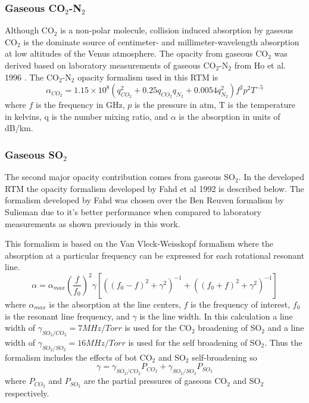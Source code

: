 \subsubsection{Gaseous CO$_2$-N$_2$}
Although CO$_2$ is a non-polar molecule, collision induced absorption by gaseous CO$_2$ \cite{Barrett-1960} is the dominate source of centimeter- and millimeter-wavelength absorption at low altitudes of the Venus atmosphere. The opacity from gaseous CO$_2$ was derived based on laboratory measurements of gaseous CO$_2$-N$_2$ from Ho et al. 1996 \cite{Ho-1966}. The CO$_2$-N$_2$ opacity formalism used in this RTM is
\begin{equation}\label{eq:rtm-co2n2}
\alpha_{CO_2} = 1.15\times 10^8(q_{CO_2}^2 + 0.25q_{CO_2}q_{N_2} + 0.0054q_{N_2}^2)f^2p^2T^{-5}
\end{equation}
where $f$ is the frequency in GHz, $p$ is the pressure in atm, T is the temperature in kelvins, q is the number mixing ratio, and $\alpha$ is the absorption in units of dB/km.

\subsubsection{Gaseous SO$_2$}
The second major opacity contribution comes from gaseous SO$_2$. In the developed RTM the opacity formalism developed by Fahd et al 1992 \cite{Fahd-thesis} is described below. The formalism developed by Fahd was chosen over the Ben Reuven formalism by Sulieman due to it's better performance when compared to laboratory measurements as shown previously in this work.

This formalism is based on the Van Vleck-Weisskopf formalism where the absorption at a particular frequency can be expressed for each rotational resonant line. 
\begin{equation}
\label{eq:rtm-so2fahd}
\alpha = \alpha_{max} \left(\frac{f}{f_0}\right)^2 \gamma [((f_0-f)^2+\gamma^2)^{-1}+((f_0+f)^2 + \gamma^2)^{-1}]
\end{equation}
where $\alpha_{max}$ is the absorption at the line centers, $f$ is the frequency of interest, $f_0$ is the resonant line frequency, and $\gamma$ is the line width. In this calculation a line width of $\gamma_{SO_2/CO_2} = 7MHz/Torr$ is used for the CO$_2$ broadening of SO$_2$ and a line width of $\gamma_{SO_2/SO_2} = 16MHz/Torr$ is used for the self broadening of SO$_2$. Thus the formalism includes the effects of bot CO$_2$ and SO$_2$ self-broadening so 
\begin{equation}
\gamma = \gamma_{SO_2/CO_2}P_{CO_2} + \gamma_{SO_2/SO_2}P_{SO_2}
\end{equation}
where $P_{CO_2}$ and $P_{SO_2}$ are the partial pressures of gaseous CO$_2$ and SO$_2$ respectively.

